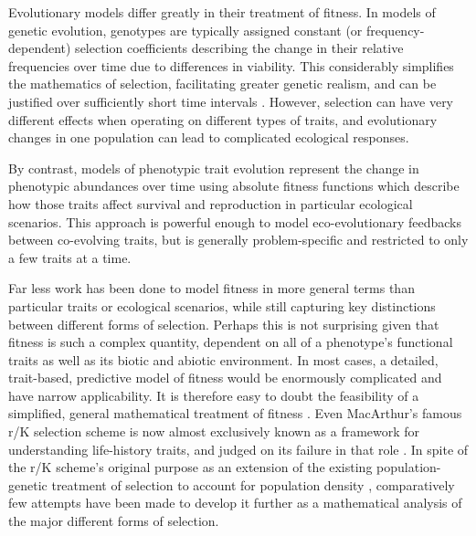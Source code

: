 \documentclass[11pt]{article}
\begin{document}
Evolutionary models differ greatly in their treatment of fitness. In models of genetic evolution, genotypes are typically assigned constant (or frequency-dependent) selection coefficients describing the change in their relative frequencies over time due to differences in viability. This considerably simplifies the mathematics of selection, facilitating greater genetic realism, and can be justified over sufficiently short time intervals \citep[p. 276]{ewens_2012}. However, selection can have very different effects when operating on different types of traits, and evolutionary changes in one population can lead to complicated ecological responses.

By contrast, models of phenotypic trait evolution represent the change in phenotypic abundances over time using absolute fitness functions which describe how those traits affect survival and reproduction in particular ecological scenarios. This approach is powerful enough to model eco-evolutionary feedbacks between co-evolving traits, but is generally problem-specific and restricted to only a few traits at a time.

Far less work has been done to model fitness in more general terms than particular traits or ecological scenarios, while still capturing key distinctions between different forms of selection. Perhaps this is not surprising given that fitness is such a complex quantity, dependent on all of a phenotype's functional traits \citep{violle_2007} as well as its biotic and abiotic environment. In most cases, a detailed, trait-based, predictive model of fitness would be enormously complicated and have narrow applicability. It is therefore easy to doubt the feasibility of a simplified, general mathematical treatment of fitness \citep[p. 276]{ewens_2012}. Even MacArthur's famous r/K selection scheme is now almost exclusively known as a framework for understanding life-history traits, and judged on its failure in that role \citep{pianka_1970,stearns_1977,boyce_1984,reznick_2002}. In spite of the r/K scheme's original purpose as an extension of the existing population-genetic treatment of selection to account for population density \citep{macarthur_1962}, comparatively few attempts have been made to develop it further as a mathematical analysis of the major different forms of selection. 
\end{document}
